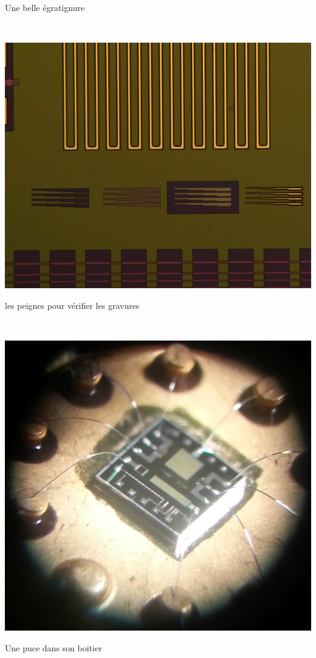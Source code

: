 \documentclass{article}
\begin{document}
\begin{centering}
    Une belle égratignure

    ~

    \includegraphics[width=\linewidth-2cm]{peignes.png}

    les peignes pour vérifier les gravures

    ~

    \includegraphics[width=\linewidth-4cm]{photo.jpg}

    Une puce dans son boitier

\end{centering}
\end{document}
